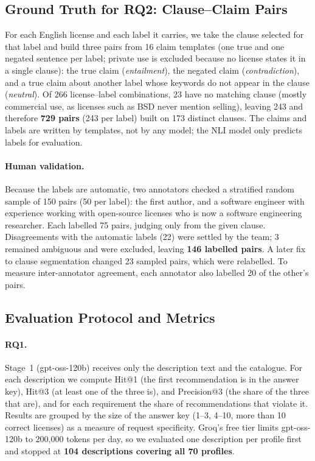 \subsection{Ground Truth for RQ2: Clause--Claim Pairs}
\label{ss:gt2}

For each English license and each label it carries, we take the clause selected for that label and build three pairs from 16 claim templates (one true and one negated sentence per label; private use is excluded because no license states it in a single clause): the true claim (\emph{entailment}), the negated claim (\emph{contradiction}), and a true claim about another label whose keywords do not appear in the clause (\emph{neutral}). Of 266 license--label combinations, 23 have no matching clause (mostly commercial use, as licenses such as BSD never mention selling), leaving 243 and therefore \textbf{729 pairs} (243 per label) built on 173 distinct clauses. The claims and labels are written by templates, not by any model; the NLI model only predicts labels for evaluation.

\paragraph{Human validation.} Because the labels are automatic, two annotators checked a stratified random sample of 150 pairs (50 per label): the first author, and a software engineer with experience working with open-source licenses who is now a software engineering researcher. Each labelled 75 pairs, judging only from the given clause. Disagreements with the automatic labels (22) were settled by the team; 3 remained ambiguous and were excluded, leaving \textbf{146 labelled pairs}. A later fix to clause segmentation changed 23 sampled pairs, which were relabelled. To measure inter-annotator agreement, each annotator also labelled 20 of the other's pairs.

\subsection{Evaluation Protocol and Metrics}
\label{ss:metrics}

\paragraph{RQ1.} Stage~1 (gpt-oss-120b) receives only the description text and the catalogue. For each description we compute Hit@1 (the first recommendation is in the answer key), Hit@3 (at least one of the three is), and Precision@3 (the share of the three that are), and for each requirement the share of recommendations that violate it. Results are grouped by the size of the answer key (1--3, 4--10, more than 10 correct licenses) as a measure of request specificity. Groq's free tier limits gpt-oss-120b to 200{,}000 tokens per day, so we evaluated one description per profile first and stopped at \textbf{104 descriptions covering all 70 profiles}.

